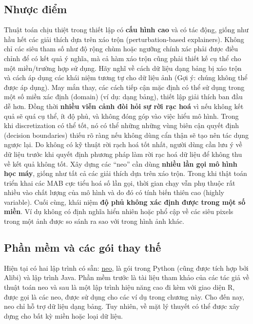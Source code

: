 \subsection{Nhược điểm}
Thuật toán chịu thiệt trong thiết lập có \textbf{cấu hình cao} và có tác động, giống như hầu hết các giải thích dựa trên xáo trộn (perturbation-based explainers). Không chỉ các siêu tham số như độ rộng chùm hoặc ngưỡng chính xác phải được điều chỉnh để có kết quả ý nghĩa, mà cả hàm xáo trộn cũng phải thiết kế cụ thể cho một miền/trường hợp sử dụng. Hãy nghĩ về cách dữ liệu dạng bảng bị xáo trộn và cách áp dụng các khái niệm tương tự cho dữ liệu ảnh (Gợi ý: chúng không thể được áp dụng). May mắn thay, các cách tiếp cận mặc định có thể sử dụng trong một số miền xác định (domain) (ví dụ: dạng bảng), thiết lập giải thích ban đầu dễ hơn.
Đồng thời \textbf{nhiều viễn cảnh đòi hỏi sự rời rạc hoá} vì nếu không kết quả sẽ quá cụ thể, ít độ phủ, và không đóng góp vào việc hiểu mô hình. Trong khi discretization có thể tốt, nó có thể những những vùng biên cận quyết định (decision boundaries) thiếu rõ ràng nếu không dùng cẩn thận sẽ tạo nên tác dụng ngược lại. Do không có kỹ thuật rời rạch hoá tốt nhất, người dùng cần lưu ý về dữ liệu trước khi quyết định phương pháp làm rời rạc hoá dữ liệu để không thu về kết quả không tốt.
Xây dựng các “neo” cần dùng \textbf{nhiều lần gọi mô hình học máy}, giống như tất cả các giải thích dựa trên xáo trộn. Trong khi thật toán triển khai các MAB cực tiểu hoá số lần gọi, thời gian chạy vẫn phụ thuộc rất nhiều vào chất lượng của mô hình và do đó có tính biến thiên cao (highly variable).
Cuối cùng, khái niệm \textbf{độ phủ không xác định được trong một số miền}. Ví dụ không có định nghĩa hiển nhiên hoặc phổ cập về các siêu pixels trong một ảnh được so sánh ra sao với trong hình ảnh khác. 

\subsection{Phần mềm và các gói thay thế}
Hiện tại có hai lập trình có sẵn: \href{ https://github.com/marcotcr/anchor}{neo}, là gói trong Python (cũng được tích hợp bởi Alibi) và lập trình Java. Phần mềm trước là tài liệu tham khảo của các tác giả về thuật toán neo và sau là một lập trình hiệu năng cao đi kèm với giao diện R, được gọi là các neo, được sử dụng cho các ví dụ trong chương này. Cho đến nay, neo chỉ hỗ trợ dữ liệu dạng bảng. Tuy nhiên, về mặt lý thuyết có thể được xây dựng cho bất kỳ miền hoặc loại dữ liệu.

\clearpage

